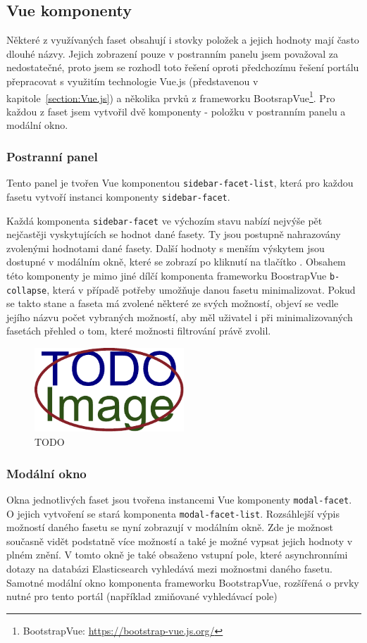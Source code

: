 \subsection{Vue komponenty}
Některé z využívaných faset obsahují i stovky položek a jejich hodnoty mají často dlouhé názvy. Jejich zobrazení pouze v postranním panelu jsem považoval za nedostatečné, proto jsem se rozhodl toto řešení oproti předchozímu řešení portálu přepracovat s využitím technologie Vue.js (představenou v kapitole~\ref{section:Vue.js}) a několika prvků z frameworku BootsrapVue\footnote{BootstrapVue: \url{https://bootstrap-vue.js.org/}}. Pro každou z faset jsem vytvořil dvě komponenty - položku v postranním panelu a modální okno.

\subsubsection*{Postranní panel}\label{section:sidebar}
Tento panel je tvořen Vue komponentou \texttt{sidebar-facet-list}, která pro každou fasetu vytvoří instanci komponenty \texttt{sidebar-facet}.

Každá komponenta \texttt{sidebar-facet} ve výchozím stavu nabízí nejvýše pět nejčastěji vyskytujících se hodnot dané fasety. Ty jsou postupně nahrazovány zvolenými hodnotami dané fasety. Další hodnoty s menším výskytem jsou dostupné v modálním okně, které se zobrazí po kliknutí na tlačítko . Obsahem této komponenty je mimo jiné dílčí komponenta frameworku BoostrapVue \texttt{b-collapse}, která v případě potřeby umožňuje danou fasetu minimalizovat. Pokud se takto stane a faseta má zvolené některé ze svých možností, objeví se vedle jejího názvu počet vybraných možností, aby měl uživatel i při minimalizovaných fasetách přehled o tom, které možnosti filtrování právě zvolil.

\begin{figure}[H]
	\centering
	\includegraphics[width=0.5\textwidth]{obrazky-figures/placeholder.pdf}
	\caption{TODO}
	\label{mvc}
\end{figure}


\subsubsection*{Modální okno}
Okna jednotlivých faset jsou tvořena instancemi Vue komponenty \texttt{modal-facet}. O jejich vytvoření se stará komponenta \texttt{modal-facet-list}.
Rozsáhlejší výpis možností daného fasetu se nyní zobrazují v modálním okně. Zde je možnost současně vidět podstatně více možností a také je možné vypsat jejich hodnoty v plném znění. V tomto okně je také obsaženo vstupní pole, které asynchronními dotazy na databázi Elasticsearch vyhledává mezi možnostmi daného fasetu. Samotné modální okno komponenta frameworku BootstrapVue, rozšířená o prvky nutné pro tento portál (například zmiňované vyhledávací pole) 

